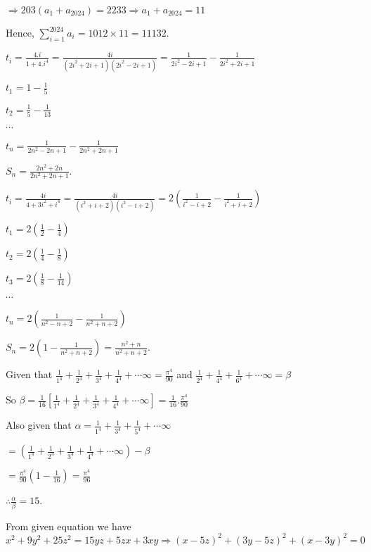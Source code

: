   $\Rightarrow 203(a_1 + a_{2024}) = 2233 \Rightarrow a_1 + a_{2024} = 11$

  Hence, $\displaystyle\sum_{i = 1}^{2024}a_i = 1012\times11 = 11132$.
\item $t_i = \frac{4.i}{1 + 4.i^4} = \frac{4i}{(2i^2 + 2i + 1)(2i^2 - 2i + 1)} = \frac{1}{2i^2 - 2i + 1}
  - \frac{1}{2i^2 + 2i + 1}$

  $t_1 = 1 - \frac{1}{5}$

  $t_2 = \frac{1}{5} - \frac{1}{13}$

  $\cdots$

  $t_n = \frac{1}{2n^2 - 2n + 1} - \frac{1}{2n^2 + 2n + 1}$

  $S_n = \frac{2n^2 + 2n}{2n^2 + 2n + 1}$.
\item $t_i = \frac{4i}{4 + 3i^2 + i^4} = \frac{4i}{(i^2 + i + 2)(i^2 - i + 2)} = 2\left(\frac{1}{i^2 - i +
  2} - \frac{1}{i^2 + i + 2}\right)$

  $t_1 = 2\left(\frac{1}{2} - \frac{1}{4}\right)$

  $t_2 = 2\left(\frac{1}{4} - \frac{1}{8}\right)$

  $t_3 = 2\left(\frac{1}{8} - \frac{1}{14}\right)$

  $\cdots$

  $t_n = 2\left(\frac{1}{n^2 - n + 2} - \frac{1}{n^2 + n + 2}\right)$

  $S_n = 2\left(1 - \frac{1}{n^2 + n + 2}\right) = \frac{n^2 + n}{n^2 + n + 2}$.
\item Given that $\frac{1}{1^4} + \frac{1}{2^4} + \frac{1}{3^4} + \frac{1}{4^4} + \cdots \infty
  = \frac{\pi^4}{90}$ and $\frac{1}{2^4} + \frac{1}{4^4} + \frac{1}{6^4} + \cdots \infty = \beta$

  So $\beta = \frac{1}{16}\left[\frac{1}{1^4} + \frac{1}{2^4} + \frac{1}{3^4} + \frac{1}{4^4}
    + \cdots \infty\right] = \frac{1}{16}.\frac{\pi^4}{90}$

  Also given that $\alpha = \frac{1}{1^4} + \frac{1}{3^4} + \frac{1}{5^4} + \cdots \infty$

  $= \left(\frac{1}{1^4} + \frac{1}{2^4} + \frac{1}{3^4} + \frac{1}{4^4} + \cdots \infty\right) - \beta$

  $= \frac{\pi^4}{90}\left(1 - \frac{1}{16}\right) = \frac{\pi^4}{96}$

  $\therefore \frac{\alpha}{\beta} = 15$.
\item From given equation we have $x^2 + 9y^2 + 25z^2 = 15yz + 5zx + 3xy \Rightarrow (x - 5z)^2 + (3y -
  5z)^2 + (x - 3y)^2 = 0$

